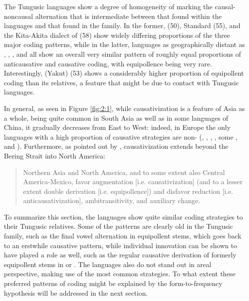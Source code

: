 \documentclass[output=paper,colorlinks,citecolor=brown]{langscibook}
\begin{document}
The Tungusic languages show a degree of homogeneity of marking the causal-noncausal alternation that is intermediate between that found within the  languages and that found in the  family. In the former,  (50), Standard  (55), and the Kita-Akita dialect of  (58) show widely differing proportions of the three major coding patterns, while in the latter, languages as geographically distant as , , , and  all show an overall very similar pattern of roughly equal proportions of anticausative and causative coding, with equipollence being very rare. Interestingly,  (Yakut) (53) shows a considerably higher proportion of equipollent coding than its  relatives, a feature that might be due to contact with Tungusic languages.

In general, as seen in Figure \ref{fig:2:1}, while causativization is a feature of Asia as a whole, being quite common in South Asia as well as in some languages of China, it gradually decreases from East to West: indeed, in Europe the only languages with a high proportion of causative strategies are non- (, , , , some , and ). Furthermore, as pointed out by \citet[180]{Nichols2004}, causativization extends beyond the Bering Strait into North America:

\begin{quote}
    Northern Asia and North America, and to some extent also Central America-Mexico, favor augmentation [i.e. causativization] (and to a lesser extent double derivation [i.e. equipollence]) and disfavor reduction [i.e. anticausativization], ambitransitivity, and auxiliary change.
\end{quote}

To summarize this section, the  languages show quite similar coding strategies to their Tungusic relatives. Some of the patterns are clearly old in the Tungusic family, such as the final vowel alternation in equipollent stems, which goes back to an erstwhile causative pattern, while individual innovation can be shown to have played a role as well, such as the regular causative derivation of formerly equipollent stems in  or . The  languages also do not stand out in areal perspective, making use of the most common strategies. To what extent these preferred patterns of coding might be explained by the form-to-frequency hypothesis will be addressed in the next section.
\end{document}
